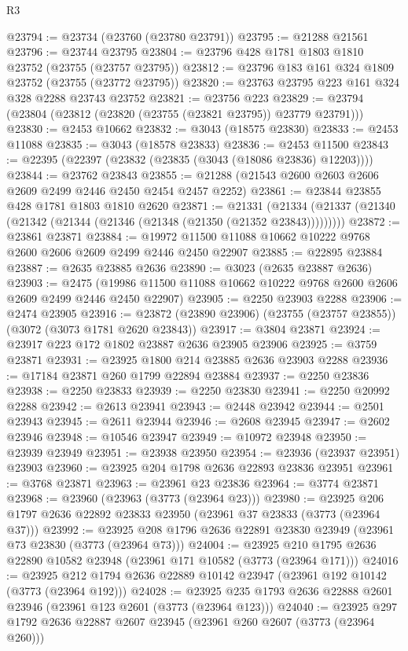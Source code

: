 \begin{lexlean}{R3}
\begin{coremodule}
@23794 := @23734 (@23760 (@23780 @23791))
@23795 := @21288 @21561
@23796 := @23744 @23795
@23804 := @23796 @428 @1781 @1803 @1810 @23752 (@23755 (@23757 @23795))
@23812 := @23796 @183 @161 @324 @1809 @23752 (@23755 (@23772 @23795))
@23820 := @23763 @23795 @223 @161 @324 @328 @2288 @23743 @23752
@23821 := @23756 @223
@23829 := @23794 (@23804 (@23812 (@23820 (@23755 (@23821 @23795)) @23779 @23791)))
@23830 := @2453 @10662
@23832 := @3043 (@18575 @23830)
@23833 := @2453 @11088
@23835 := @3043 (@18578 @23833)
@23836 := @2453 @11500
@23843 := @22395 (@22397 (@23832 (@23835 (@3043 (@18086 @23836) @12203))))
@23844 := @23762 @23843
@23855 := @21288 (@21543 @2600 @2603 @2606 @2609 @2499 @2446 @2450 @2454 @2457 @2252)
@23861 := @23844 @23855 @428 @1781 @1803 @1810 @2620
@23871 := @21331
    (@21334 (@21337 (@21340 (@21342 (@21344 (@21346 (@21348 (@21350 (@21352 @23843)))))))))
@23872 := @23861 @23871
@23884 := @19972 @11500 @11088 @10662 @10222 @9768 @2600 @2606 @2609 @2499 @2446 @2450 @22907
@23885 := @22895 @23884
@23887 := @2635 @23885 @2636
@23890 := @3023 (@2635 @23887 @2636)
@23903 := @2475
    (@19986 @11500 @11088 @10662 @10222 @9768 @2600 @2606 @2609 @2499 @2446 @2450 @22907)
@23905 := @2250 @23903 @2288
@23906 := @2474 @23905
@23916 := @23872 (@23890 @23906) (@23755 (@23757 @23855)) (@3072 (@3073 @1781 @2620 @23843))
@23917 := @3804 @23871
@23924 := @23917 @223 @172 @1802 @23887 @2636 @23905 @23906
@23925 := @3759 @23871
@23931 := @23925 @1800 @214 @23885 @2636 @23903 @2288
@23936 := @17184 @23871 @260 @1799 @22894 @23884
@23937 := @2250 @23836
@23938 := @2250 @23833
@23939 := @2250 @23830
@23941 := @2250 @20992 @2288
@23942 := @2613 @23941
@23943 := @2448 @23942
@23944 := @2501 @23943
@23945 := @2611 @23944
@23946 := @2608 @23945
@23947 := @2602 @23946
@23948 := @10546 @23947
@23949 := @10972 @23948
@23950 := @23939 @23949
@23951 := @23938 @23950
@23954 := @23936 (@23937 @23951) @23903
@23960 := @23925 @204 @1798 @2636 @22893 @23836 @23951
@23961 := @3768 @23871
@23963 := @23961 @23 @23836
@23964 := @3774 @23871
@23968 := @23960 (@23963 (@3773 (@23964 @23)))
@23980 := @23925 @206 @1797 @2636 @22892 @23833 @23950 (@23961 @37 @23833 (@3773 (@23964 @37)))
@23992 := @23925 @208 @1796 @2636 @22891 @23830 @23949 (@23961 @73 @23830 (@3773 (@23964 @73)))
@24004 := @23925 @210 @1795 @2636 @22890 @10582 @23948 (@23961 @171 @10582 (@3773 (@23964 @171)))
@24016 := @23925 @212 @1794 @2636 @22889 @10142 @23947 (@23961 @192 @10142 (@3773 (@23964 @192)))
@24028 := @23925 @235 @1793 @2636 @22888 @2601 @23946 (@23961 @123 @2601 (@3773 (@23964 @123)))
@24040 := @23925 @297 @1792 @2636 @22887 @2607 @23945 (@23961 @260 @2607 (@3773 (@23964 @260)))

\end{coremodule}
\end{lexlean}
